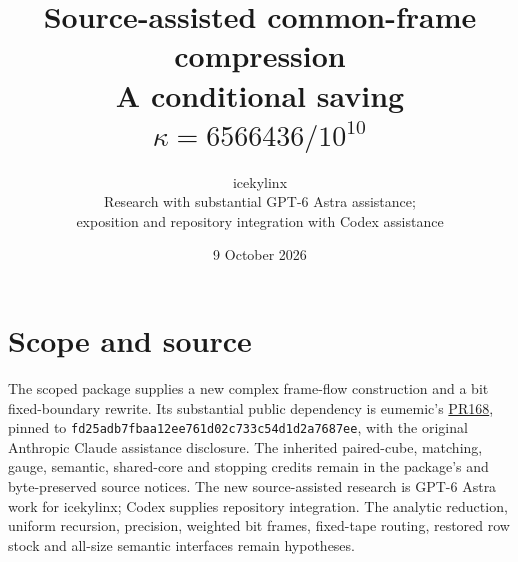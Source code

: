 \documentclass[11pt]{article}
\title{Source-assisted common-frame compression\\
\large A conditional saving $\kappa=6566436/10^{10}$}
\author{icekylinx\\\small Research with substantial GPT-6 Astra assistance;\\
\small exposition and repository integration with Codex assistance}
\date{9 October 2026}
\begin{document}
\maketitle

\section{Scope and source}
The scoped package  supplies a new
complex frame-flow construction and a bit fixed-boundary rewrite.
Its substantial public dependency is eumemic's
\href{https://github.com/CrocSwap/integer-mult-bounds/pull/168}{PR168},
pinned to \texttt{fd25adb7fbaa12ee761d02c733c54d1d2a7687ee},
with the original Anthropic Claude assistance disclosure. The inherited
paired-cube, matching, gauge, semantic, shared-core and stopping credits
remain in the package's  and byte-preserved source notices.
The new source-assisted research is GPT-6 Astra work for icekylinx;
Codex supplies repository integration. The analytic reduction, uniform
recursion, precision, weighted bit frames, fixed-tape routing, restored
row stock and all-size semantic interfaces remain hypotheses.
\end{document}
